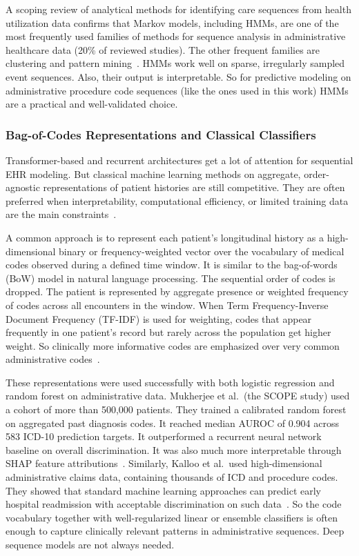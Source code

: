 A scoping review of analytical methods for identifying care sequences from health utilization data confirms that Markov models, including HMMs, are one of the most frequently used families of methods for sequence analysis in administrative healthcare data (20\% of reviewed studies). The other frequent families are clustering and pattern mining~\cite{flothow2023scoping}. HMMs work well on sparse, irregularly sampled event sequences. Also, their output is interpretable. So for predictive modeling on administrative procedure code sequences (like the ones used in this work) HMMs are a practical and well-validated choice.

\subsubsection{Bag-of-Codes Representations and Classical Classifiers}
\label{subsec:bag_of_codes}

Transformer-based and recurrent architectures get a lot of attention for sequential EHR modeling. But classical machine learning methods on aggregate, order-agnostic representations of patient histories are still competitive. They are often preferred when interpretability, computational efficiency, or limited training data are the main constraints~\cite{humbert2021tfidf}.

A common approach is to represent each patient's longitudinal history as a high-dimensional binary or frequency-weighted vector over the vocabulary of medical codes observed during a defined time window. It is similar to the bag-of-words (BoW) model in natural language processing. The sequential order of codes is dropped. The patient is represented by aggregate presence or weighted frequency of codes across all encounters in the window. When Term Frequency-Inverse Document Frequency (TF-IDF) is used for weighting, codes that appear frequently in one patient's record but rarely across the population get higher weight. So clinically more informative codes are emphasized over very common administrative codes~\cite{humbert2021tfidf, chen2023scope}.

These representations were used successfully with both logistic regression and random forest on administrative data. Mukherjee et al.\ (the SCOPE study) used a cohort of more than 500,000 patients. They trained a calibrated random forest on aggregated past diagnosis codes. It reached median AUROC of 0.904 across 583 ICD-10 prediction targets. It outperformed a recurrent neural network baseline on overall discrimination. It was also much more interpretable through SHAP feature attributions~\cite{chen2023scope}. Similarly, Kalloo et al.\ used high-dimensional administrative claims data, containing thousands of ICD and procedure codes. They showed that standard machine learning approaches can predict early hospital readmission with acceptable discrimination on such data~\cite{kalloo2014claims}. So the code vocabulary together with well-regularized linear or ensemble classifiers is often enough to capture clinically relevant patterns in administrative sequences. Deep sequence models are not always needed.

